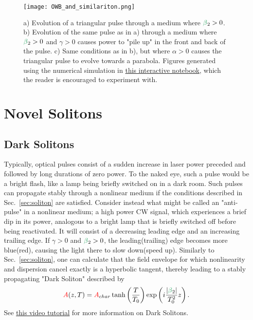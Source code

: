 \begin{figure}
    \centering
    \texttt{[image: OWB\_and\_similariton.png]}
    \caption{a) Evolution of a triangular pulse through a medium where $\betag_2>0$. b) Evolution of the same pulse as in a) through a medium where $\betag_2>0$ and $\gamma>0$ causes power to "pile up" in the front and back of the pulse. c) Same conditions as in b), but where $\alpha>0$ causes the triangular pulse to evolve towards a parabola. Figures generated using the numerical simulation in \href{https://colab.research.google.com/drive/1qtMcXElXn4VBntfCgXIGGkyDfiGicElx?usp=sharing}{this interactive notebook}, which the reader is encouraged to experiment with.  }
    \label{fig:OWB_and_similariton}
\end{figure}


\section{Novel Solitons}
\subsection{Dark Solitons} 
Typically, optical pulses consist of a sudden increase in laser power preceded and followed by long durations of zero power. To the naked eye, such a pulse would be a bright flash, like a lamp being briefly switched on in a dark room. Such pulses can propagate stably through a nonlinear medium if the conditions described in Sec.~\ref{sec:soliton} are satisfied. Consider instead what might be called an "anti-pulse" in a nonlinear medium; a high power CW signal, which experiences a brief dip in its power, analogous to a bright lamp that is briefly switched off before being reactivated. It will consist of a decreasing leading edge and an increasing trailing edge. If $\gamma>0$ and $\betag_2>0$, the leading(trailing) edge becomes more blue(red), causing the light there to slow down(speed up). Similarly to Sec.~\ref{sec:soliton}, one can calculate that the field envelope for which nonlinearity and dispersion cancel exactly is a hyperbolic tangent, thereby leading to a stably propagating "Dark Soliton" described by 
\begin{align}
    \A(z,T) = \A_{char}\tanh\left(\frac{T}{T_0}\right)\exp\left(i\frac{|\betag_2|}{T_0^2}z \right).
\end{align}
See \href{https://youtu.be/MrNfI1_eTZ0}{this video tutorial} for more information on Dark Solitons.


